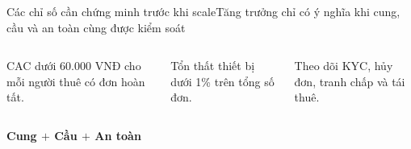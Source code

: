 \begin{frame}{Các chỉ số cần chứng minh trước khi scale}{Tăng trưởng chỉ có ý nghĩa khi cung, cầu và an toàn cùng được kiểm soát}
  \vspace{.8em}
  \begin{columns}[T,onlytextwidth]
      \par\vspace{.45em}
      CAC dưới 60.000 VNĐ cho mỗi người thuê có đơn hoàn tất.
      \par\vspace{.45em}
      Tổn thất thiết bị dưới 1\% trên tổng số đơn.
      \par\vspace{.45em}
      Theo dõi KYC, hủy đơn, tranh chấp và tái thuê.
  \end{columns}
  \vfill
  \centering\Large\textcolor{mutuxBlue}{\textbf{Cung $+$ Cầu $+$ An toàn}}
\end{frame}
